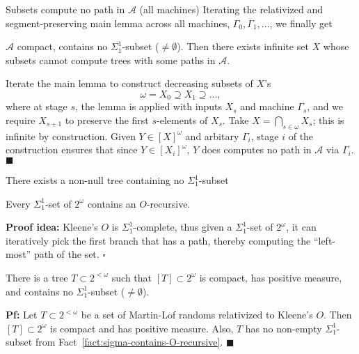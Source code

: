 \begin{frame}{Subsets compute no path in $\mathcal{A}$ (all machines)}
  Iterating the relativized and segment-preserving main lemma across all
  machines, $\Gamma_0,\Gamma_1,\ldots$, we finally get
  \begin{main-thm*}
    $\mathcal{A}$ compact, contains no $\Sigma_1^1$-subset
    ($\neq\emptyset$). Then there exists infinite set $X$ whose subsets
    cannot compute trees with some paths in $\mathcal{A}$.
  \end{main-thm*}

  Iterate the main lemma to construct decreasing subsets of $X$'s
  \[\omega= X_0\supseteq X_1\supseteq\ldots,\]
  where at stage $s$, the lemma is applied with inputs $X_s$ and machine
  $\Gamma_s$, and we require $X_{s+1}$ to preserve the first $s$-elements
  of $X_s$. Take $X=\bigcap_{s\in\omega}X_s$; this is infinite by
  construction. Given $Y\in[X]^\omega$ and arbitary $\Gamma_i$, stage $i$
  of the construction ensures that since $Y\in[X_i]^\omega$, $Y$ does
  computes no path in $\mathcal{A}$ via $\Gamma_i$. $\blacksquare$
\end{frame}

\begin{frame}{There exists a non-null tree containing no $\Sigma_1^1$-subset}
  \begin{fact}
    \label{fact:sigma-contains-O-recursive}
    Every $\Sigma_1^1$-set of $2^\omega$ contains an $O$-recursive.
  \end{fact}
  \textbf{Proof idea:} Kleene's $O$ is $\Sigma_1^1$-complete, thus given a 
  $\Sigma_1^1$-set of $2^\omega$, it can iteratively pick the first branch
  that has a path, thereby computing the ``left-most'' path of the set.
  $\square$

  \vspace{1em}
  \begin{thm}
    There is a tree $T\subset2^{<\omega}$ such that $[T]\subset
    2^\omega$ is compact, has positive measure, and contains no
    $\Sigma_1^1$-subset ($\neq\emptyset$).
  \end{thm}
  \textbf{Pf:} Let $T\subset2^{<\omega}$ be a set of Martin-Lof randoms
  relativized to Kleene's $O$. Then $[T]\subset 2^\omega$ is compact and
  has positive measure. Also, $T$ has no non-empty $\Sigma_1^1$-subset from
  Fact~\ref{fact:sigma-contains-O-recursive}. $\blacksquare$
\end{frame}

